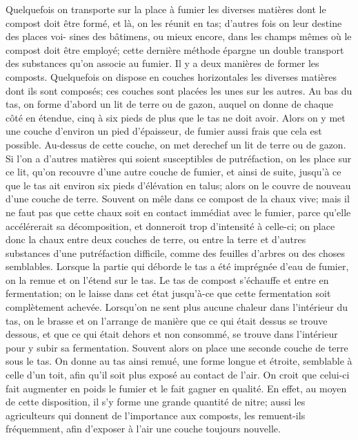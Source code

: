 Quelquefois on transporte sur la place à fumier les diverses matières dont le compost doit être formé, et là, on les réunit en tas; d'autres fois on leur destine des places voi- sines des bâtimens, ou mieux encore, dans les champs mêmes où le compost doit être employé; cette dernière méthode épargne\setcounter{page}{54} un double transport des substances qu'on associe au fumier. Il y a deux manières de former les composts. Quelquefois on dispose en couches horizontales les diverses matières dont ils sont composés; ces couches sont placées les unes sur les autres. Au bas du tas, on forme d'abord un lit de terre ou de gazon, auquel on donne de chaque côté en étendue, cinq à six pieds de plus que le tas ne doit avoir. Alors on y met une couche d'environ un pied d'épaisseur, de fumier aussi frais que cela est possible. Au-dessus de cette couche, on met derechef un lit de terre ou de gazon. Si l'on a d'autres matières qui soient susceptibles de putréfaction, on les place sur ce lit, qu'on recouvre d'une autre couche de fumier, et ainsi de suite, jusqu'à ce que le tas ait environ six pieds d'élévation en talus; alors on le couvre de nouveau d'une couche de terre. Souvent on mêle dans ce compost de la chaux vive; mais il ne faut pas que cette chaux soit en contact immédiat avec le fumier, parce qu'elle accélérerait sa décomposition, et donneroit trop d'intensité à celle-ci; on place donc la chaux entre deux couches de terre, ou entre la terre et d'autres substances\setcounter{page}{55} d'une putréfaction difficile, comme des feuilles d'arbres ou des choses semblables. Lorsque la partie qui déborde le tas a été imprégnée d'eau de fumier, on la remue et on l'étend sur le tas.
Le tas de compost s'échauffe et entre en fermentation; on le laisse dans cet état jusqu'à-ce que cette fermentation soit complètement achevée. Lorsqu'on ne sent plus aucune chaleur dans l'intérieur du tas, on le brasse et on l'arrange de manière que ce qui était dessus se trouve dessous, et que ce qui était dehors et non consommé, se trouve dans l'intérieur pour y subir sa fermentation. Souvent alors on place une seconde couche de terre sous le tas.
On donne au tas ainsi remué, une forme longue et étroite, semblable à celle d'un toit, afin qu'il soit plus exposé au contact de l'air. On croit que celui-ci fait augmenter en poids le fumier et le fait gagner en qualité. En effet, au moyen de cette disposition, il s'y forme une grande quantité de nitre; aussi les agriculteurs qui donnent de l'importance aux composts, les remuent-ils fréquemment, afin d'exposer à l'air une couche toujours nouvelle.
